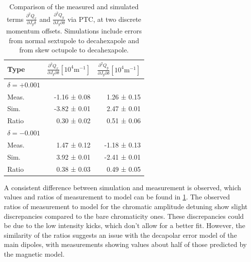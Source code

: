 \begin{table}[H]
  \centering
  \begin{tabular}{lrr}
  \toprule
   Type  & $\frac{\partial^2 Q_x}{\partial J_y \partial \delta}[10^{4}\mathrm{m}^{-1}]$ & $\frac{\partial^2 Q_y}{\partial J_y \partial \delta}[10^{4}\mathrm{m}^{-1}]$ \\
  \midrule
  $\delta = +0.001$ & & \\
  \hspace{2mm}Meas.  &   -1.16 ± 0.08 &   1.26 ± 0.15 \\
  \hspace{2mm}Sim.   &   -3.82 ± 0.01 &   2.47 ± 0.01 \\
  \hspace{2mm}Ratio  &    0.30 ± 0.02 &   0.51 ± 0.06 \\
  $\delta = -0.001$ & & \\
  \hspace{2mm}Meas.  &  1.47 ± 0.12  &  -1.18 ± 0.13 \\
  \hspace{2mm}Sim.   &  3.92 ± 0.01  &  -2.41 ± 0.01 \\
  \hspace{2mm}Ratio  &  0.38 ± 0.03  &   0.49 ± 0.05 \\
  \bottomrule
  \end{tabular}
  \caption{Comparison of the measured and simulated terms $\frac{\partial^2 Q_x}{\partial J_y
   \delta}$ and $\frac{\partial^2 Q_y}{\partial J_y \partial \delta}$ via PTC, at two
  discrete momentum offsets. Simulations include errors from normal sextupole to decahexapole and
  from skew octupole to decahexapole.}
  \label{table:decapoles:chromatic_ampdet}
\end{table}



A consistent difference between simulation and measurement is observed, which values and
ratios of measurement to model can be found in \cref{table:decapoles:chromatic_ampdet}.
The observed ratios of measurement to model for the chromatic amplitude detuning show slight
discrepancies compared to the bare chromaticity ones. These discrepancies could be due to the low
intensity kicks, which don't allow for a better fit. However, the similarity of the ratios suggests
an issue with the decapolar error model of the main dipoles, with measurements showing values about
half of those predicted by the magnetic model.